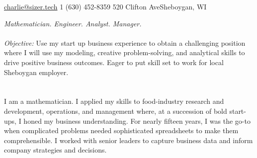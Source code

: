 \documentclass[10pt,a4paper]{article} %
\begin{document}
 



\noindent\href{mailto:charlie@sizer.tech}{charlie@sizer.tech}\bull %
\textsmaller{+}1 (630) 452-8359\bull %
520 Clifton Ave\bull Sheboygan, WI%

\spacedhrule{0.9em}{-0.4em} %



\vspace{-1.3em} %

\begin{multicols}{2}  %
\noindent \textit{Mathematician. Engineer. Analyst. Manager.}\\\\
\emph{Objective: }Use my start up business experience to obtain a challenging position where I will use my modeling, creative problem-solving, and analytical skills to drive positive business outcomes.  Eager to put skill set to work for local Sheboygan employer.   \\
\\\\
\noindent 
I am a mathematician. I applied my skills to food-industry research and development, operations, and management where, at a succession of bold start-ups, I honed my business understanding. For nearly fifteen years, I was the go-to when complicated problems needed sophisticated spreadsheets to make them comprehensible. I worked with senior leaders to capture business data and inform company strategies and decisions.

\end{multicols}
\end{document}
